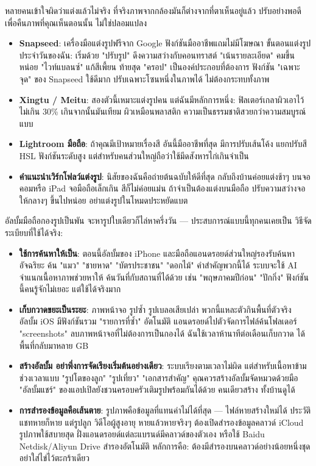 
หลายคนเข้าใจผิดว่าแต่งแล้วไม่จริง ที่จริงภาพจากกล้องมันก็ต่างจากที่ตาเห็นอยู่แล้ว ปรับอย่างพอดีเพื่อคืนภาพที่คุณเห็นตอนนั้น ไม่ใช่ปลอมแปลง

\begin{itemize}
  \item \textbf{Snapseed}: เครื่องมือแต่งรูปฟรีจาก Google ฟังก์ชันมืออาชีพแถมไม่มีโฆษณา ขั้นตอนแต่งรูปประจำวันของฉัน: เริ่มด้วย "ปรับรูป" ดึงความสว่างกับคอนทราสต์ "เน้นรายละเอียด" คมขึ้นหน่อย "ไวท์แบลนซ์" แก้สีเพี้ยน ท้ายสุด "ครอป" เป็นองค์ประกอบที่ต้องการ ฟังก์ชัน "เฉพาะจุด" ของ Snapseed ใช้ดีมาก ปรับเฉพาะโซนหนึ่งในภาพได้ ไม่ต้องกระทบทั้งภาพ
  \item \textbf{Xingtu / Meitu}: สองตัวนี้เหมาะแต่งรูปคน แต่ฉันมีหลักการหนึ่ง: ฟิลเตอร์เกลาผิวเอาไว้ไม่เกิน 30\% เกินจากนั้นมันเทียม ผิวเหมือนพลาสติก ความเป็นธรรมชาติสวยกว่าความสมบูรณ์แบบ
  \item \textbf{Lightroom มือถือ}: ถ้าคุณมีเป้าหมายเรื่องสี อันนี้มืออาชีพที่สุด มีการปรับเส้นโค้ง แยกปรับสี HSL ฟังก์ชันระดับสูง แต่สำหรับคนส่วนใหญ่ถือว่าใช้มีดสังหารไก่เกินจำเป็น
  \item \textbf{คำแนะนำเวิร์กโฟลว์แต่งรูป}: นิสัยของฉันคือถ่ายต้นฉบับให้ดีที่สุด กลับถึงบ้านค่อยแต่งช้าๆ บนจอคอมหรือ iPad จอมือถือเล็กเกิน สีก็ไม่ค่อยแม่น ถ้าจำเป็นต้องแต่งบนมือถือ ปรับความสว่างจอให้กลางๆ ขึ้นไปหน่อย อย่าแต่งรูปในโหมดประหยัดแบต
\end{itemize}


อัลบั้มมือถือกองรูปเป็นพัน จะหารูปใบเดียวก็ไล่หาครึ่งวัน — ประสบการณ์แบบนี้ทุกคนเคยเป็น วิธีจัดระเบียบที่ใช้ได้จริง:

\begin{itemize}
  \item \textbf{ใช้การค้นหาให้เป็น}: ตอนนี้อัลบั้มของ iPhone และมือถือแอนดรอยด์ส่วนใหญ่รองรับค้นหาอัจฉริยะ ค้น "แมว" "ชายหาด" "บัตรประชาชน" "ดอกไม้" คำสำคัญพวกนี้ได้ ระบบจะใช้ AI จำแนกเนื้อหาภาพช่วยหาให้ ค้นวันที่กับสถานที่ได้ด้วย เช่น "พฤษภาคมปีก่อน" "ปักกิ่ง" ฟังก์ชันนี้คนรู้จักไม่เยอะ แต่ใช้ได้จริงมาก
  \item \textbf{เก็บกวาดขยะเป็นระยะ}: ภาพหน้าจอ รูปซ้ำ รูปเบลอเสียเปล่า พวกนี้แหละตัวกินพื้นที่ตัวจริง อัลบั้ม iOS มีฟังก์ชันรวม "รายการที่ซ้ำ" อัตโนมัติ แอนดรอยด์ไปตัวจัดการไฟล์ค้นโฟลเดอร์ "screenshots" ลบภาพหน้าจอที่ไม่ต้องการเป็นกองได้ ฉันใช้เวลาห้านาทีต่อเดือนเก็บกวาด ได้พื้นที่กลับมาหลาย GB
  \item \textbf{สร้างอัลบั้ม อย่าพึ่งการจัดเรียงเริ่มต้นอย่างเดียว}: ระบบเรียงตามเวลาไม่ผิด แต่สำหรับเนื้อหาข้ามช่วงเวลาแบบ "รูปโตของลูก" "รูปเที่ยว" "เอกสารสำคัญ" คุณควรสร้างอัลบั้มจัดหมวดด้วยมือ "อัลบั้มแชร์" ของแอปเปิลยังชวนครอบครัวเติมรูปพร้อมกันได้ด้วย คนเดียวสร้าง ทั้งบ้านดูได้
  \item \textbf{การสำรองข้อมูลคือเส้นตาย}: รูปภาพคือข้อมูลที่แทนค่าไม่ได้ที่สุด — ไฟล์หายสร้างใหม่ได้ ประวัติแชทหายก็หาย แต่รูปลูก วิดีโอผู้สูงอายุ หายแล้วหายจริงๆ ต้องเปิดสำรองข้อมูลคลาวด์ iCloud รูปภาพใช้สบายสุด ฝั่งแอนดรอยด์แต่ละแบรนด์มีคลาวด์ของตัวเอง หรือใช้ Baidu Netdisk/Aliyun Drive สำรองอัตโนมัติ หลักการคือ: ต้องมีสำรองบนคลาวด์อย่างน้อยหนึ่งชุด อย่าใส่ไข่ไว้ตะกร้าเดียว
\end{itemize}

